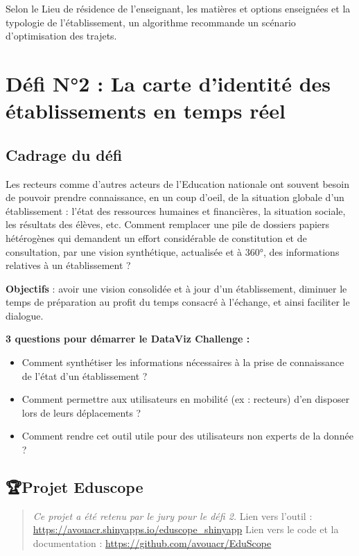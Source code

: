 \documentclass[]{book}
\providecommand{\tightlist}{%
  \setlength{\itemsep}{0pt}\setlength{\parskip}{0pt}}
\begin{document}
Selon le Lieu de résidence de l'enseignant, les matières et options
enseignées et la typologie de l'établissement, un algorithme recommande
un scénario d'optimisation des trajets.

\section{Défi N°2 : La carte d'identité des établissements en temps
réel}\label{defi-n2-la-carte-didentite-des-etablissements-en-temps-reel}

\subsection{Cadrage du défi}\label{cadrage-du-defi-1}

Les recteurs comme d'autres acteurs de l'Education nationale ont souvent
besoin de pouvoir prendre connaissance, en un coup d'oeil, de la
situation globale d'un établissement : l'état des ressources humaines et
financières, la situation sociale, les résultats des élèves, etc.
Comment remplacer une pile de dossiers papiers hétérogènes qui demandent
un effort considérable de constitution et de consultation, par une
vision synthétique, actualisée et à 360°, des informations relatives à
un établissement ?

\textbf{Objectifs} : avoir une vision consolidée et à jour d'un
établissement, diminuer le temps de préparation au profit du temps
consacré à l'échange, et ainsi faciliter le dialogue.

\textbf{3 questions pour démarrer le DataViz Challenge :}

\begin{itemize}
\tightlist
\item
  Comment synthétiser les informations nécessaires à la prise de
  connaissance de l'état d'un établissement ?
\item
  Comment permettre aux utilisateurs en mobilité (ex : recteurs) d'en
  disposer lors de leurs déplacements ?
\item
  Comment rendre cet outil utile pour des utilisateurs non experts de la
  donnée ?
\end{itemize}

\subsection{🏆Projet Eduscope}\label{projet-eduscope}

\begin{quote}
\emph{Ce projet a été retenu par le jury pour le défi 2.} Lien vers
l'outil : \url{https://avouacr.shinyapps.io/eduscope_shinyapp} Lien vers
le code et la documentation : \url{https://github.com/avouacr/EduScope}
\end{quote}
\end{document}
